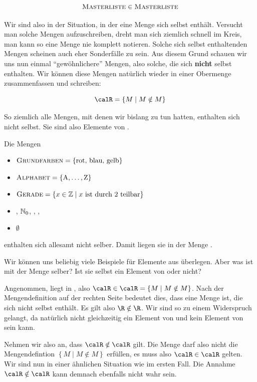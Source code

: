\documentclass[../../main.tex]{subfiles}
\begin{document}
\[\textsc{Masterliste} \in \textsc{Masterliste}\]


Wir sind also in der Situation, in der eine Menge sich selbst enthält. Versucht man solche Mengen aufzuschreiben, dreht man sich ziemlich schnell im Kreis, man kann so eine Menge nie komplett notieren. Solche sich selbst enthaltenden Mengen scheinen auch eher Sonderfälle zu sein. Aus diesem Grund schauen wir uns nun einmal \enquote{gewöhnlichere} Mengen, also solche, die sich \textbf{nicht} selbst enthalten. Wir können diese Mengen natürlich wieder in einer Obermenge zusammenfassen und schreiben:

\[\calR = \left\{ M \mid M \notin M \right\}\]

So ziemlich alle Mengen, mit denen wir bislang zu tun hatten, enthalten sich nicht selbst. Sie sind also Elemente von \calR.

\begin{example}{}
	Die Mengen
	\begin{itemize}
		\item $\textsc{Grundfarben} = \left\{\text{rot, blau, gelb}\right\}$
		\item $\textsc{Alphabet} = \left\{\text{A},\ldots,\text{Z}\right\}$
		\item $\textsc{Gerade} = \left\{x \in \mathbb{Z} \mid x \text{ ist durch 2 teilbar}\right\}$
		\item \Natural, $\mathbb{N}_0$, \Integer, \Rational, \Real
		\item $\emptyset$
	\end{itemize}
	enthalten sich allesamt nicht selber. Damit liegen sie in der Menge \R.
\end{example}

Wir können uns beliebig viele Beispiele für Elemente aus \calR überlegen. Aber was ist mit der Menge \calR selber? Ist sie selbst ein Element von \calR oder nicht?

Angenommen, \calR liegt in \calR, also $\calR \in \calR = \left\{ M \mid M \notin M \right\}$. Nach der Mengendefinition auf der 
rechten Seite bedeutet dies, dass \R eine Menge ist, die sich nicht selbst enthält. Es gilt also $\R \notin \R$. Wir sind 
so zu einem Widerspruch gelangt, da \R natürlich nicht gleichzeitig ein Element von \R und kein Element von \R sein kann.

Nehmen wir also an, dass $\calR \notin \calR$ gilt. Die Menge \calR darf also nicht die Mengendefintion $\left\{ M \mid M \notin M \right\}$ erfüllen, es muss also $\calR \in \calR$ gelten. Wir sind nun in einer ähnlichen Situation wie im ersten Fall. Die Annahme $\calR \notin \calR$ kann demnach ebenfalls nicht wahr sein.
\end{document}
